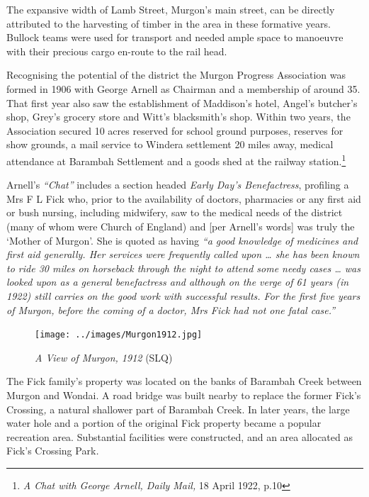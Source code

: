 \smallskip


The expansive width of Lamb Street, Murgon's main street, can be directly attributed to the harvesting of timber in the area in these formative years. Bullock teams were used for transport and needed ample space to manoeuvre with their precious cargo en-route to the rail head.



Recognising the potential of the district the Murgon Progress Association was formed in 1906 with George Arnell as Chairman and a membership of around 35. That first year also saw the establishment of Maddison's hotel, Angel's butcher's shop, Grey's grocery store and Witt's blacksmith's shop. Within two years, the Association secured 10 acres reserved for school ground purposes, reserves for show grounds, a mail service to Windera settlement 20 miles away, medical attendance at Barambah Settlement and a goods shed at the railway station.\footnote{\emph{A Chat with George Arnell, Daily Mail,} 18 April 1922, p.10}


Arnell's \emph{``Chat''} includes a section headed \emph{Early Day's Benefactress}, profiling a Mrs F L Fick who, prior to the availability of doctors, pharmacies or any first aid or bush nursing, including midwifery, saw to the medical needs of the district (many of whom were Church of England) and {[}per Arnell's words{]} was truly the `Mother of Murgon'. She is quoted as having \emph{``a good knowledge of medicines and first aid generally. Her services were frequently called upon \ldots{} she has been known to ride 30 miles on horseback through the night to attend some needy cases \ldots{} was looked upon as a general benefactress and although on the verge of 61 years (in 1922) still carries on the good work with successful results. For the first five years of Murgon, before the coming of a doctor, Mrs Fick had not one fatal case.''}









\begin{figure}[htb]
\begin{center}
\texttt{[image: ../images/Murgon1912.jpg]}
\caption{{\itshape A View of Murgon, 1912} {\scriptsize(SLQ)}}
\end{center}
\end{figure}


The Fick family's property was located on the banks of Barambah Creek between Murgon and Wondai. A road bridge was built nearby to replace the former Fick's Crossing\emph{,} a natural shallower part of Barambah Creek. In later years, the large water hole and a portion of the original Fick property became a popular recreation area. Substantial facilities were constructed, and an area allocated as Fick's Crossing Park\emph{.}



